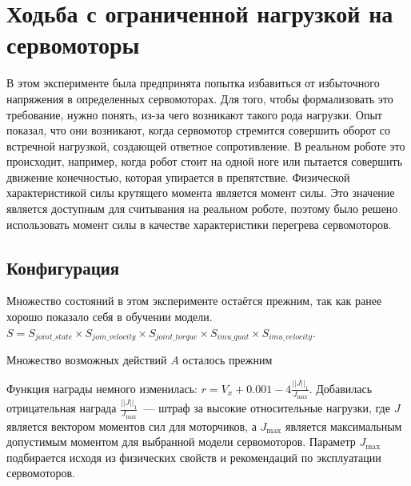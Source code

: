 \section{Ходьба с ограниченной нагрузкой на сервомоторы}\label{sec:ch4/sec5}
В этом эксперименте была предпринята попытка избавиться от избыточного напряжения в определенных сервомоторах. Для того, чтобы формализовать это требование, нужно понять, из-за чего возникают такого рода нагрузки. Опыт показал, что они возникают, когда сервомотор стремится совершить оборот со встречной нагрузкой, создающей ответное сопротивление. В реальном роботе это происходит, например, когда робот стоит на одной ноге или пытается совершить движение конечностью, которая упирается в препятствие. Физической характеристикой силы крутящего момента является момент силы. Это значение является доступным для считывания на реальном роботе, поэтому было решено использовать момент силы в качестве характеристики перегрева сервомоторов.

\subsection{Конфигурация}\label{sec:ch4.1/sec5}
Множество состояний в этом эксперименте остаётся прежним, так как ранее хорошо показало себя в обучении модели.  $S = S_{joint\_state} \times S_{join\_velocity} \times S_{joint\_torque} \times S_{imu\_quat} \times S_{imu\_velocity}$.

Множество возможных действий $A$ осталось прежним

Функция награды немного изменилась: $r = V_x + 0.001 - 4 \frac{||J||_1}{J_\max}$. Добавилась отрицательная награда $\frac{||J||_1}{J_\max}$~--- штраф за высокие относительные нагрузки, где $J$ является вектором моментов сил для моторчиков, а $J_\max$ является максимальным допустимым моментом для выбранной модели сервомоторов. Параметр $J_\max$ подбирается исходя из физических свойств и рекомендаций по эксплуатации сервомоторов. 


